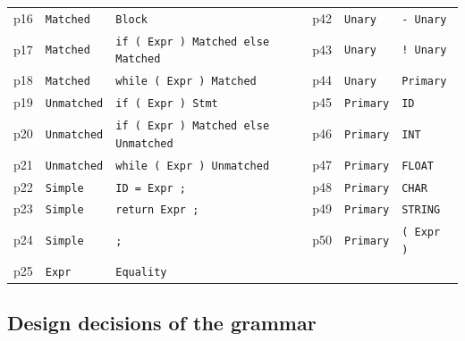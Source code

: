 \documentclass[11pt,letterpaper]{article}
\let\oldsubsection\subsection
\renewcommand{\subsection}{\needspace{6\baselineskip}\oldsubsection}
\begin{document}
{\begin{longtable}{@{}l l l | l l l@{}}
p16 & \texttt{Matched} & \texttt{Block} & p42 & \texttt{Unary} & \texttt{- Unary}\\
p17 & \texttt{Matched} & \texttt{if ( Expr ) Matched else Matched} & p43 & \texttt{Unary} & \texttt{! Unary}\\
p18 & \texttt{Matched} & \texttt{while ( Expr ) Matched} & p44 & \texttt{Unary} & \texttt{Primary}\\
p19 & \texttt{Unmatched} & \texttt{if ( Expr ) Stmt} & p45 & \texttt{Primary} & \texttt{ID}\\
p20 & \texttt{Unmatched} & \texttt{if ( Expr ) Matched else Unmatched} & p46 & \texttt{Primary} & \texttt{INT}\\
p21 & \texttt{Unmatched} & \texttt{while ( Expr ) Unmatched} & p47 & \texttt{Primary} & \texttt{FLOAT}\\
p22 & \texttt{Simple} & \texttt{ID = Expr ;} & p48 & \texttt{Primary} & \texttt{CHAR}\\
p23 & \texttt{Simple} & \texttt{return Expr ;} & p49 & \texttt{Primary} & \texttt{STRING}\\
p24 & \texttt{Simple} & \texttt{;} & p50 & \texttt{Primary} & \texttt{( Expr )}\\
p25 & \texttt{Expr} & \texttt{Equality} &  & & \\
\bottomrule
\end{longtable}
}

\subsection{Design decisions of the grammar}
\end{document}

